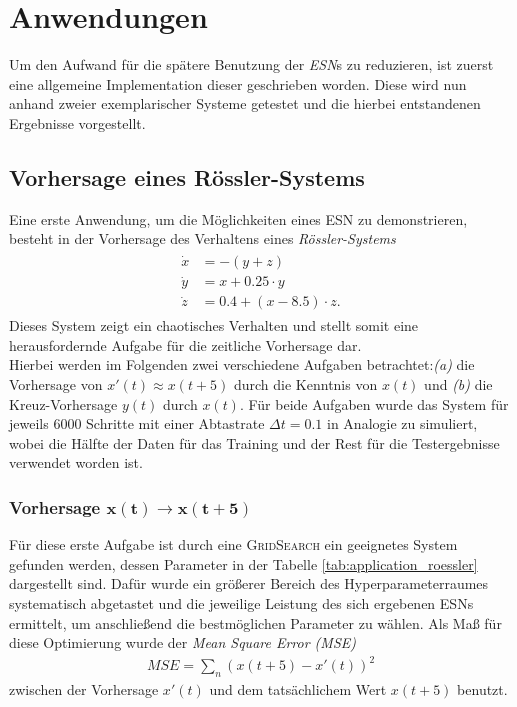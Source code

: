\section{Anwendungen}
\label{chp:applications}
Um den Aufwand für die spätere Benutzung der \textit{ESN}s zu reduzieren, ist zuerst eine allgemeine Implementation dieser geschrieben worden. Diese wird nun anhand zweier exemplarischer Systeme getestet und die hierbei entstandenen Ergebnisse vorgestellt.

\subsection{Vorhersage eines Rössler-Systems}
Eine erste Anwendung, um die Möglichkeiten eines \textsc{ESN} zu demonstrieren, besteht in der Vorhersage des Verhaltens eines \textit{Rössler-Systems}
\begin{align}
\label{eq:application_roessler_pde}
\begin{split}
\dot{x} &= -(y+z)\\
\dot{y} &= x + 0.25 \cdot  y\\
\dot{z} &= 0.4 + (x - 8.5)\cdot z.
\end{split}
\end{align}
Dieses System zeigt ein chaotisches Verhalten und stellt somit eine herausfordernde Aufgabe für die zeitliche Vorhersage dar.\\
Hierbei werden im Folgenden zwei verschiedene Aufgaben betrachtet:\textit{(a)} die Vorhersage von $x'(t) \approx x(t+5)$ durch die Kenntnis von $x(t)$ und \textit{(b)} die Kreuz-Vorhersage $y(t)$ durch $x(t)$. Für beide Aufgaben wurde das System für jeweils $6000$ Schritte mit einer Abtastrate $\Delta t = 0.1$ in Analogie zu \cite{parlitz2005} simuliert, wobei die Hälfte der Daten für das Training und der Rest für die Testergebnisse verwendet worden ist.

\subsubsection[Vorhersage $x(t) \rightarrow x(t+5)$]{Vorhersage $\pmb{x(t) \rightarrow x(t+5)}$}
\label{sec:cross_pred_x_xplusfive}
Für diese erste Aufgabe ist durch eine \textsc{GridSearch} ein geeignetes System gefunden werden, dessen Parameter in der Tabelle \ref{tab:application_roessler} dargestellt sind. Dafür wurde ein größerer Bereich des Hyperparameterraumes systematisch abgetastet und die jeweilige Leistung des sich ergebenen \textsc{ESN}s ermittelt, um anschließend die bestmöglichen Parameter zu wählen. Als Maß für diese Optimierung wurde der \textit{Mean Square Error (MSE)}
\begin{align}
MSE = \sum_n \left(x(t+5) - x'(t) \right)^2
\end{align}
zwischen der Vorhersage $x'(t)$ und dem tatsächlichem Wert $x(t+5)$ benutzt.

